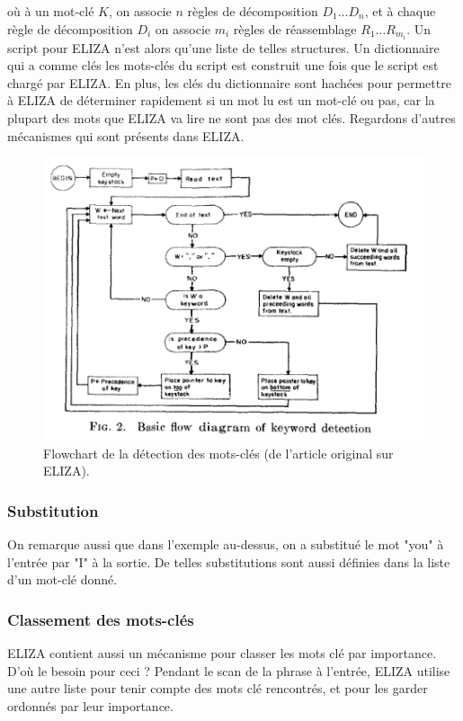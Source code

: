 \documentclass[11pt, a4paper]{report}
\begin{document}
  où à un mot-clé $K$, on associe $n$ règles de décomposition $D_{1} \ldots D_{n}$, et à 
  chaque règle de décomposition $D_{i}$ on associe $m_{i}$ règles de réassemblage 
  $R_{1} \ldots R_{m_{i}}$. Un script pour ELIZA 
  n'est alors qu'une liste de telles structures. Un dictionnaire qui a comme clés 
  les mots-clés du script est construit une fois que le script est chargé par ELIZA. 
  En plus, les clés du dictionnaire sont hachées pour permettre à ELIZA de déterminer 
  rapidement si un mot lu est un mot-clé ou pas, car la plupart des mots que ELIZA va lire 
  ne sont pas des mot clés. Regardons 
  d'autres mécanismes qui sont présents dans ELIZA.

  \begin{figure}[t]
    \centering
    \includegraphics[width=1\textwidth]{eliza-keyword-detection.png}
    \caption{Flowchart de la détection des mots-clés (de l'article original sur ELIZA).}
    \label{fig:eliza-flowchart}
  \end{figure}

  \subsubsection{Substitution}
  On remarque aussi que dans l'exemple au-dessus, on a substitué le mot "you" à l'entrée par "I"
  à la sortie. De telles substitutions sont aussi définies dans la liste d'un mot-clé donné.  
  
  \subsubsection{Classement des mots-clés}
  ELIZA contient aussi un mécanisme pour classer les mots clé par importance. D'où le besoin 
  pour ceci ?  Pendant le scan de la phrase à l'entrée, 
  ELIZA utilise une autre liste pour tenir compte des mots clé rencontrés, et pour les garder 
  ordonnés par leur importance.
  
\end{document}
